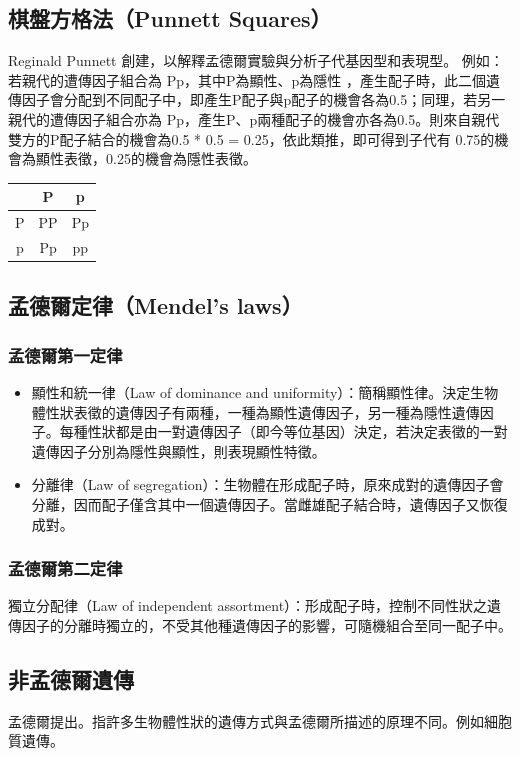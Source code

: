 \documentclass[a4paper,12pt]{report}
\begin{document}
\subsection{棋盤方格法（Punnett Squares）}
Reginald Punnett 創建，以解釋孟德爾實驗與分析子代基因型和表現型。 例如：若親代的遭傳因子組合為 Pp，其中P為顯性、p為隱性 ，產生配子時，此二個遺傳因子會分配到不同配子中，即產生P配子與p配子的機會各為0.5；同理，若另一親代的遭傳因子組合亦為 Pp，產生P、p兩種配子的機會亦各為0.5。則來自親代雙方的P配子結合的機會為0.5 * 0.5 = 0.25，依此類推，即可得到子代有 0.75的機會為顯性表徵，0.25的機會為隱性表徵。
\begin{longtable}[c]{|c|c|c|}
\hline
& P & p \\ \hline
P & PP & Pp \\ \hline
p & Pp & pp \\ \hline
\end{longtable}
\subsection{孟德爾定律（Mendel's laws）}
\subsubsection{孟德爾第一定律}
\begin{itemize}
\item 顯性和統一律（Law of dominance and uniformity）：簡稱顯性律。決定生物體性狀表徵的遺傳因子有兩種，一種為顯性遺傳因子，另一種為隱性遺傳因子。每種性狀都是由一對遺傳因子（即今等位基因）決定，若決定表徵的一對遺傳因子分別為隱性與顯性，則表現顯性特徵。
\item 分離律（Law of segregation）：生物體在形成配子時，原來成對的遺傳因子會分離，因而配子僅含其中一個遺傳因子。當雌雄配子結合時，遺傳因子又恢復成對。
\end{itemize}
\subsubsection{孟德爾第二定律}
獨立分配律（Law of independent assortment）：形成配子時，控制不同性狀之遺傳因子的分離時獨立的，不受其他種遺傳因子的影響，可隨機組合至同一配子中。
\subsection{非孟德爾遺傳}
孟德爾提出。指許多生物體性狀的遺傳方式與孟德爾所描述的原理不同。例如細胞質遺傳。
\end{document}

